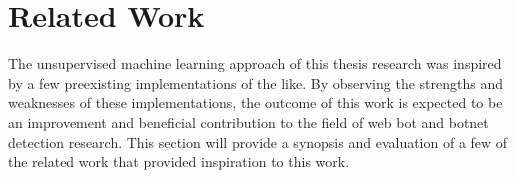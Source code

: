 
\chapter{Related Work}\label{ch:related-work}
The unsupervised machine learning approach of this thesis research was inspired by a few preexisting implementations of the like.
By observing the strengths and weaknesses of these implementations, the outcome of this work is expected to be an improvement and beneficial contribution to the field of web bot and botnet detection research.
This section will provide a synopsis and evaluation of a few of the related work that provided inspiration to this work.






